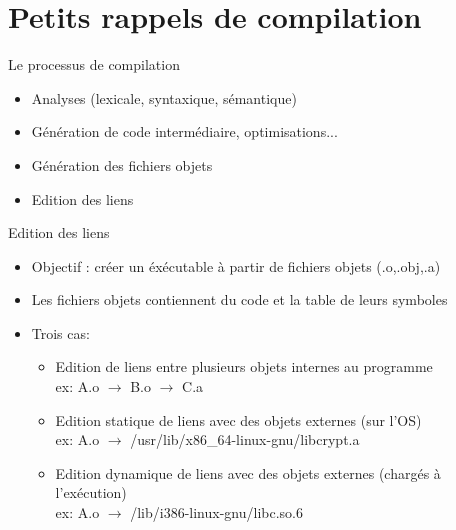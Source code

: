 \section{Petits rappels de compilation}


\begin{frame}{Le processus de compilation}
	\begin{itemize}
		\item Analyses (lexicale, syntaxique, sémantique)
		\item Génération de  code intermédiaire, optimisations...
		\item Génération des fichiers objets
		\item Edition des liens
	\end{itemize}
\end{frame}

\begin{frame}{Edition des liens}
	\begin{itemize}
		\item Objectif : créer un éxécutable à partir de fichiers objets (.o,.obj,.a)
		\item Les fichiers objets contiennent du code et la table de leurs symboles
		\item Trois cas:
		\begin{itemize}
		
		\item Edition de liens entre plusieurs objets internes au programme \\
		    ex: A.o $\rightarrow$ B.o $\rightarrow$ C.a
		\item Edition statique de liens avec des objets externes (sur l'OS) \\
		    ex: A.o $\rightarrow$ /usr/lib/x86\_64-linux-gnu/libcrypt.a
		\item Edition dynamique de liens avec des objets externes (chargés à l'exécution) \\
			ex: A.o $\rightarrow$ /lib/i386-linux-gnu/libc.so.6
		\end{itemize}
	\end{itemize}
\end{frame}
